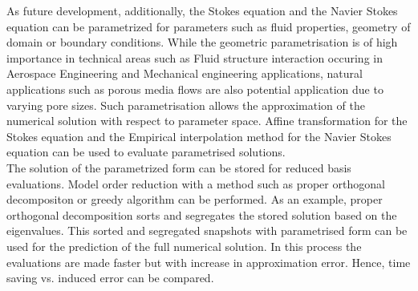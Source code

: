 \documentclass[a4paper]{book}
\begin{document}
As future development, additionally, the Stokes equation and the Navier Stokes equation can be parametrized for parameters such as fluid properties, geometry of domain or boundary conditions. While the geometric parametrisation is of high importance in technical areas such as Fluid structure interaction occuring in Aerospace Engineering and Mechanical engineering applications, natural applications such as porous media flows are also potential application due to varying pore sizes. Such parametrisation allows the approximation of the numerical solution with respect to parameter space. Affine transformation for the Stokes equation and the Empirical interpolation method for the Navier Stokes equation can be used to evaluate parametrised solutions. \\

The solution of the parametrized form can be stored for reduced basis evaluations. Model order reduction with a method such as proper orthogonal decompositon or greedy algorithm can be performed. As an example, proper orthogonal decomposition sorts and segregates the stored solution based on the eigenvalues. This sorted and segregated snapshots with parametrised form can be used for the prediction of the full numerical solution. In this process the evaluations are made faster but with increase in approximation error. Hence, time saving vs. induced error can be compared.

\newpage
\end{document}
